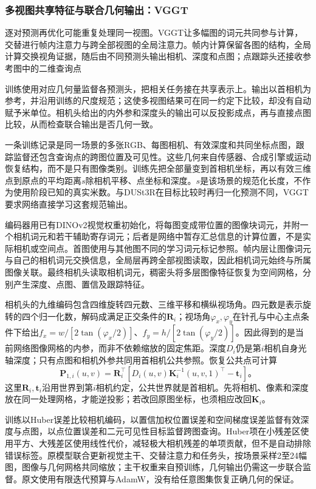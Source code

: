 \subsubsection{多视图共享特征与联合几何输出：VGGT}
\label{sec:vision-recognition-vggt}

逐对预测再优化可能重复处理同一视图。VGGT让多幅图的词元共同参与计算，交替进行帧内注意力与跨全部视图的全局注意力。帧内计算保留各图的结构，全局计算交换视角证据，随后由不同预测头输出相机、深度和点图；点跟踪头还接收参考图中的二维查询点

训练使用对应几何量监督各预测头，把相关任务接在共享表示上。输出以首相机为参考，并沿用训练的尺度规范；这使多视图结果可在同一约定下比较，却没有自动赋予米单位。相机头给出的内外参和深度头的输出可以反投影成点，再与直接点图比较，从而检查联合输出是否几何一致。

一条训练记录是同一场景的多张RGB、每图相机、有效深度和共同坐标点图，跟踪监督还包含查询点的跨图位置及可见性。这些几何来自传感器、合成引擎或运动恢复结构，而不是只有图像类别。训练先把全部量变到首相机坐标，再以有效三维点到原点的平均距离$s$除相机平移、点坐标和深度。$s$是该场景的规范化长度，不作为使用阶段已知的真实米数。与DUSt3R在目标比较时再归一化预测不同，VGGT要求网络直接学习这套规范输出。

编码器用已有DINOv2视觉权重初始化，将每图变成带位置的图像块词元，并附一个相机词元和若干辅助寄存词元；后者是网络中暂存汇总信息的计算位置，不是实际相机或空间点。首图使用与其他图不同的学习词元标记参照。帧内层让图像词元与自己的相机词元交换信息，全局层再跨全部视图读取，因此相机词元始终与所属图像关联。最终相机头读取相机词元，稠密头将多层图像特征恢复为空间网格，分别产生深度、点图、置信及跟踪特征。

相机头的九维编码包含四维旋转四元数、三维平移和横纵视场角。四元数是表示旋转的四个归一化数，解码成满足正交条件的$\bm R_i$；视场角$\varphi_x,\varphi_y$在针孔与中心主点条件下给出$f_x=w/[2\tan(\varphi_x/2)]$、$f_y=h/[2\tan(\varphi_y/2)]$。因此得到的是当前网络图像网格的内参，而非不依赖缩放的固定焦距。深度$D_i$仍是第$i$相机自身光轴深度；只有点图和相机外参共同用首相机公共参照。恢复公共点可计算
\begin{equation}
 \bm{P}_{1,i}(u,v)=
 \bm R_i^\top\left[
 D_i(u,v)\bm K_i^{-1}(u,v,1)^\top-\bm t_i\right]\text{。}
 \label{eq:vision-vggt-unprojection-process}
\end{equation}
这里$\bm R_i,\bm t_i$沿用世界到第$i$相机约定，公共世界就是首相机。先将相机、像素和深度放在同一处理网格，才能逆投影；若改回原图坐标，也须相应改回$\bm K_i$。

训练以Huber误差比较相机编码，以置信加权位置误差和空间梯度误差监督有效深度与点图，以点位置误差和二元可见性目标监督跨图查询。Huber项在小残差区使用平方、大残差区使用线性代价，减轻极大相机残差的单项贡献，但不是自动排除错误标签。原模型联合更新视觉主干、交替注意力和任务头，按场景采样2至24幅图，图像与几何网格共同缩放；主干权重来自预训练，几何输出仍需这一步联合监督。原文使用有限迭代预算与AdamW，没有给任意图集恢复正确几何的保证。

